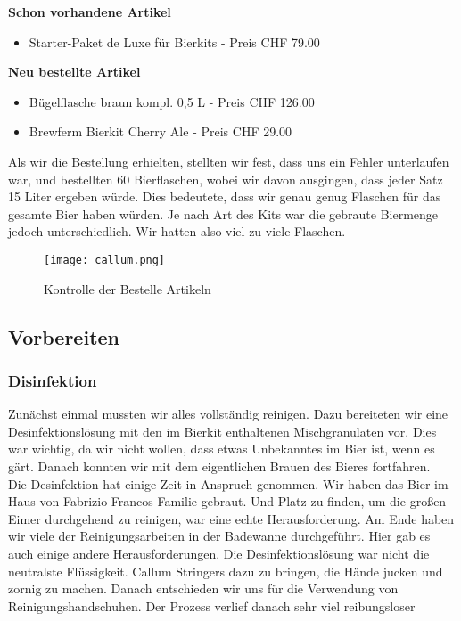 \textbf{Schon vorhandene Artikel}
\begin{itemize}
	\item Starter-Paket de Luxe für Bierkits - Preis CHF 79.00
\end{itemize}
\textbf{Neu bestellte Artikel}
\begin{itemize}
	\item Bügelflasche braun kompl. 0,5 L - Preis CHF 126.00
	\item Brewferm Bierkit Cherry Ale - Preis CHF 29.00
\end{itemize}

Als wir die Bestellung erhielten, stellten wir fest, dass uns ein Fehler unterlaufen war, und bestellten 60 Bierflaschen,
 wobei wir davon ausgingen, dass jeder Satz 15 Liter ergeben würde. Dies bedeutete, dass wir genau genug Flaschen für das gesamte Bier haben würden.
 Je nach Art des Kits war die gebraute Biermenge jedoch unterschiedlich. Wir hatten also viel zu viele Flaschen.

 \begin{figure}[!h]
	\centering
	\texttt{[image: callum.png]}
	\caption{Kontrolle der Bestelle Artikeln}
\end{figure}

\subsection{Vorbereiten}
\subsubsection{Disinfektion}
Zunächst einmal mussten wir alles vollständig reinigen.
Dazu bereiteten wir eine Desinfektionslösung mit den im Bierkit enthaltenen Mischgranulaten vor.
Dies war wichtig, da wir nicht wollen, dass etwas Unbekanntes im Bier ist, wenn es gärt.
Danach konnten wir mit dem eigentlichen Brauen des Bieres fortfahren. \\

Die Desinfektion hat einige Zeit in Anspruch genommen. Wir haben das Bier im Haus von Fabrizio Francos Familie gebraut.
Und Platz zu finden, um die großen Eimer durchgehend zu reinigen,
war eine echte Herausforderung. Am Ende haben wir viele der Reinigungsarbeiten in der Badewanne durchgeführt.
Hier gab es auch einige andere Herausforderungen. Die Desinfektionslösung war nicht die neutralste Flüssigkeit.
Callum Stringers dazu zu bringen, die Hände jucken und zornig zu machen. Danach entschieden wir uns für die Verwendung von Reinigungshandschuhen.
Der Prozess verlief danach sehr viel reibungsloser


